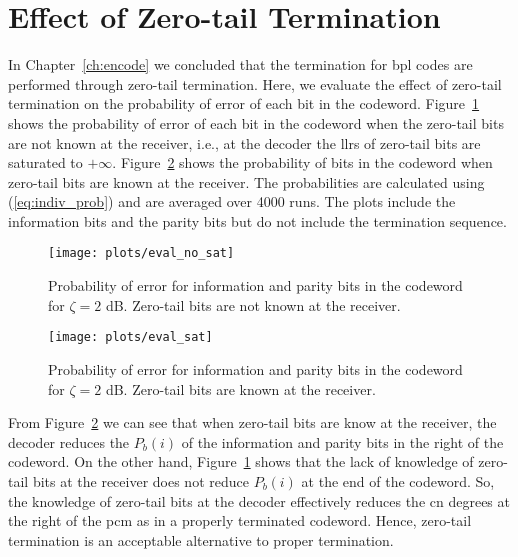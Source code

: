 \section{Effect of Zero-tail Termination}
In Chapter~\ref{ch:encode} we concluded that the termination for \gls{bpl} codes are performed through zero-tail termination. Here, we evaluate the effect of zero-tail termination on the probability of error of each bit in the codeword. Figure~\ref{fig:eval_no_sat} shows the probability of error of each bit in the codeword when the zero-tail bits are not known at the receiver, i.e., at the decoder the \glspl{llr} of zero-tail bits are saturated to $+\infty$. Figure~\ref{fig:eval_sat} shows the probability of bits in the codeword when zero-tail bits are known at the receiver. The probabilities are calculated using (\ref{eq:indiv_prob}) and are averaged over 4000 runs.  The plots include the information bits and the parity bits but do not include the termination sequence.
\begin{figure}[htbp]
  \centering
  \texttt{[image: plots/eval\_no\_sat]}
  \caption{Probability of error for information and parity bits in the codeword for $\zeta=2$ dB. Zero-tail bits are not known at the receiver.}
  \label{fig:eval_no_sat}
\end{figure}

\begin{figure}[htbp]
  \centering
  \texttt{[image: plots/eval\_sat]}
  \caption{Probability of error for information and parity bits in the codeword for $\zeta=2$ dB. Zero-tail bits are known at the receiver.}
  \label{fig:eval_sat}
\end{figure}
 
From Figure~\ref{fig:eval_sat} we can see that when zero-tail bits are know at the receiver, the decoder reduces the $P_b(i)$ of the information and parity bits in the right of the codeword. On the other hand, Figure~\ref{fig:eval_no_sat} shows that the lack of knowledge of zero-tail bits at the receiver does not reduce $P_b(i)$ at the end of the codeword. So, the knowledge of zero-tail bits at the decoder effectively reduces the \gls{cn} degrees at the right of the \gls{pcm} as in a properly terminated codeword. Hence, zero-tail termination is an acceptable alternative to proper termination.
 
